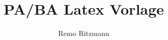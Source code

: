 %
%




\title{PA/BA Latex Vorlage}
\author{Remo Ritzmann}









\setcounter{page}{1}
\tableofcontents
\newpage

\listoffigures

\listoftables



\setcounter{page}{1}
















